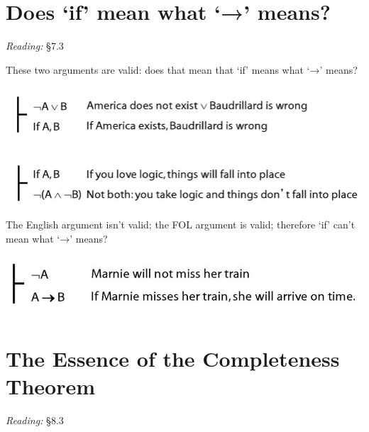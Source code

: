 \documentclass[12pt]{extarticle}
\begin{document}
\begin{multicols*}{3}
 
\section{Does ‘if’ mean what ‘→’ means?}
 
\emph{Reading:} §7.3
 
\begin{minipage}{\columnwidth}
 
These two arguments are valid: does that mean that `if' means what `→' means?
 
\begin{center}
\includegraphics[scale=0.3]{img/if_is_arrow.png}
\end{center}
\end{minipage}
 
\begin{minipage}{\columnwidth}
 
The English argument isn't valid; the FOL argument is valid; therefore `if' can't mean what `→' means?
 
\begin{center}
\includegraphics[scale=0.3]{img/if_aint_arrow.png}
\end{center}
\end{minipage}
 
 
 
\section{The Essence of the Completeness Theorem}
 
\emph{Reading:} §8.3
 

\end{multicols*}
\end{document}
